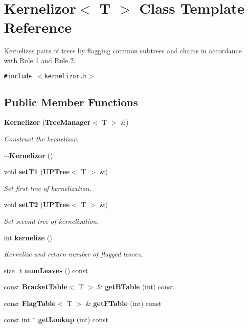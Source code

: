 \section{Kernelizor$<$ T $>$ Class Template Reference}
\label{classKernelizor}
Kernelizes pairs of trees by flagging common subtrees and chains in accordance with Rule 1 and Rule 2.  


{\tt \#include $<$kernelizor.h$>$}

\subsection*{Public Member Functions}
\begin{CompactItemize}
\item 
{\bf Kernelizor} ({\bf Tree\-Manager}$<$ T $>$ \&)
\begin{CompactList}\small\item\em Construct the kernelizor. \item\end{CompactList}\item 
{\bf $\sim$Kernelizor} ()
\item 
void {\bf set\-T1} ({\bf UPTree}$<$ T $>$ \&)
\begin{CompactList}\small\item\em Set first tree of kernelization. \item\end{CompactList}\item 
void {\bf set\-T2} ({\bf UPTree}$<$ T $>$ \&)
\begin{CompactList}\small\item\em Set second tree of kernelization. \item\end{CompactList}\item 
int {\bf kernelize} ()
\begin{CompactList}\small\item\em Kernelize and return number of flagged leaves. \item\end{CompactList}\item 
size\_\-t {\bf num\-Leaves} () const 
\item 
const {\bf Bracket\-Table}$<$ T $>$ \& {\bf get\-BTable} (int) const 
\item 
const {\bf Flag\-Table}$<$ T $>$ \& {\bf get\-FTable} (int) const 
\item 
const int $\ast$ {\bf get\-Lookup} (int) const 
\end{CompactItemize}
